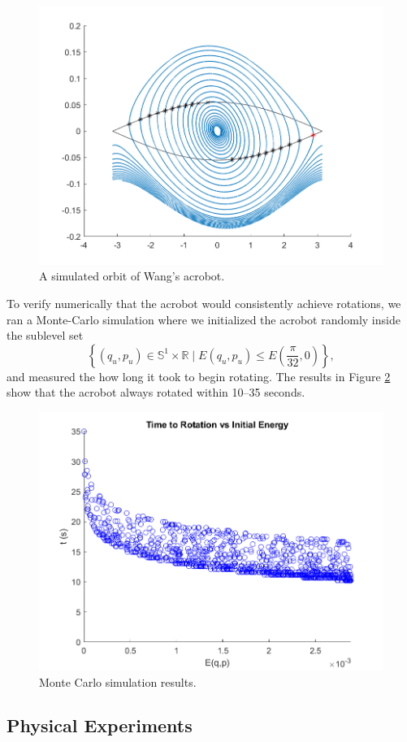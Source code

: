 \documentclass[journal,twoside,web]{ieeecolor}
\newcommand*{\R}{\mathbb{R}}
\newcommand*{\Sone}{\mathbb{S}^1}
\newcommand*{\SxR}{\Sone \times \R}
\begin{document}
\begin{figure}[]
    \centering
    \includegraphics[width=0.7\linewidth]{acrobot_orbit.png}
    \caption{A simulated orbit of Wang's acrobot.}
    \label{fig:acrobot-orbit}
\end{figure}
To verify numerically that the acrobot would consistently achieve rotations, we
ran a Monte-Carlo simulation \cite{montecarlo} where we initialized the acrobot
randomly inside the sublevel set
\[
    \left\{(q_u,p_u) \in \SxR \mid
    E(q_u,p_u) \leq E\left(\frac{\pi}{32},0\right)\right\}
    ,
\] 
and measured the how long it took to begin rotating.
The results in Figure \ref{fig:acrobot-mc} show that
the acrobot always rotated within 10--35 seconds.

\begin{figure}[]
    \centering
    \includegraphics[width=0.7\linewidth]{acrobot_mc.png}
    \caption{Monte Carlo simulation results.}
    \label{fig:acrobot-mc}
\end{figure}

\subsection{Physical Experiments}
\end{document}
